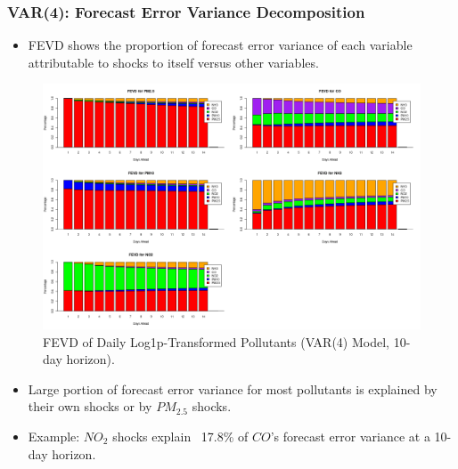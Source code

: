 \documentclass[svgnames, 12pt]{beamer}
\begin{document}
\begin{frame}
    \frametitle{VAR(4): Forecast Error Variance Decomposition}
    \begin{itemize}
        \item FEVD shows the proportion of forecast error variance of each variable attributable to shocks to itself versus other variables.
    \end{itemize}
    \begin{figure}
        \includegraphics[width=0.9\linewidth]{../analysis/assets/fevd_delhi.png}
        \caption{FEVD of Daily Log1p-Transformed Pollutants (VAR(4) Model, 10-day horizon).}
    \end{figure}
    \begin{itemize}
        \item \footnotesize Large portion of forecast error variance for most pollutants is explained by their own shocks or by $PM_{2.5}$ shocks.
        \item \footnotesize Example: $NO_2$ shocks explain ~17.8\% of $CO$'s forecast error variance at a 10-day horizon.
    \end{itemize}
\end{frame}
\end{document}
